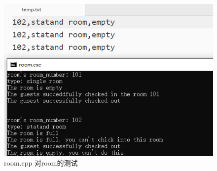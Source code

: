 \documentclass[UTF8]{ctexart}
\begin{document}
  \begin{figure}[H]
    \centering
    \includegraphics[scale=1]{test_room}
    \caption{room.cpp 对room的测试}
    \label{fig:test_room}
  \end{figure}
\end{document}
